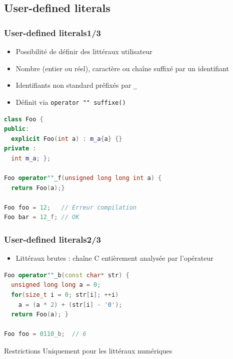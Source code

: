 \documentclass[C++.tex]{subfiles}
\begin{document}
\subsection*{User-defined literals}
\begin{frame}[fragile]
	\frametitle{User-defined literals\titlehfill{}1/3}
	\begin{itemize}
		\item Possibilité de définir des littéraux \og utilisateur\fg{}
		\item Nombre (entier ou réel), caractère ou chaîne suffixé par un identifiant
		\item Identifiants non standard préfixés par \lstinline|_|


		\item Définit via \lstinline|operator "" suffixe()|
	\end{itemize}

	\begin{lstlisting}[language=C++]
class Foo {
public:
  explicit Foo(int a) : m_a{a} {}
private :
  int m_a; };

Foo operator""_f(unsigned long long int a) {
  return Foo(a);}

Foo foo = 12;   // Erreur compilation
Foo bar = 12_f; // OK\end{lstlisting}

\end{frame}

\begin{frame}[fragile]
	\frametitle{User-defined literals\titlehfill{}2/3}
	\begin{itemize}
		\item Littéraux brutes : chaîne C entièrement analysée par l'opérateur
	\end{itemize}
	
\begin{lstlisting}[language=C++]
Foo operator""_b(const char* str) {
  unsigned long long a = 0;
  for(size_t i = 0; str[i]; ++i)
    a = (a * 2) + (str[i] - '0');
  return Foo(a); }
		
Foo foo = 0110_b;  // 6\end{lstlisting}

	\begin{alertblock}{Restrictions}
		Uniquement pour les littéraux numériques
	\end{alertblock}
\end{frame}
\end{document}
